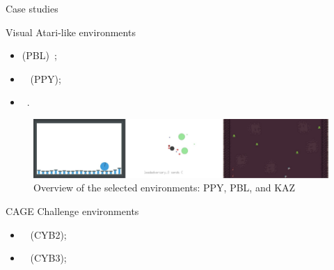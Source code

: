 \begin{frame}{Case studies}

    \begin{block}{Visual Atari-like environments}

        \begin{minipage}{0.3\textwidth}
            \centering
            \begin{itemize}
                \item {} (PBL)~\cite{Terry2021};
                \item {}~\cite{Lowe2017} (PPY);
                \item {}~\cite{Terry2021}.
            \end{itemize}
        \end{minipage}\hfill
        \begin{minipage}{0.7\textwidth}
            \centering
            \begin{figure}[H]
                \centering
                \includegraphics[width=\linewidth]{figures/envs_3x1.png}
                \caption*{Overview of the selected environments: PPY, PBL, and KAZ}
            \end{figure}
        \end{minipage}\hfill

    \end{block}

    \begin{block}{CAGE Challenge environments}

        \begin{minipage}{0.3\textwidth}
            \centering
            \begin{itemize}
                \item {}~\cite{cage_challenge_3_announcement} (CYB2);
                \item {}~\cite{cage_challenge_3_announcement} (CYB3);
            \end{itemize}
        \end{minipage}\hfill
        \begin{minipage}{0.7\textwidth}
            \centering
            \begin{figure}[H]
                \centering


\end{figure}
\end{minipage}
\end{block}
\end{frame}

